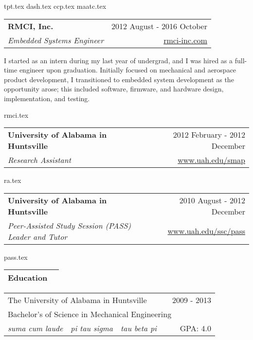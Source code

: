 \documentclass[10pt,a4paper]{article}
\newcommand{\csection}[1]{\Large\textbf{#1}}
\newcommand{\csubsection}[1]{\large\textbf{#1}}
\begin{document}
\bigskip

{tpt.tex}
{dash.tex}
{ccp.tex}
{maatc.tex}

\noindent\begin{tabularx}{\textwidth}{Xr}
  \toprule
  \csubsection{RMCI, Inc.}           & 2012 August - 2016 October                     \\
  \textit{Embedded Systems Engineer} & \href{https://www.rmci-inc.com/}{rmci-inc.com} \\
\end{tabularx}
\smallskip

I started as an intern during my last year of undergrad, and I was hired as a full-time
engineer upon graduation. Initially focused on mechanical and aerospace product
development, I transitioned to embedded system development as the opportunity arose; this
included software, firmware, and hardware design, implementation, and testing.

\bigskip

{rmci.tex}

\noindent\begin{tabularx}{\textwidth}{Xr}
  \toprule
  \csubsection{University of Alabama in Huntsville} & 2012 February - 2012 December                     \\
  \textit{Research Assistant}                       & \href{https://www.uah.edu/smap}{www.uah.edu/smap} \\
\end{tabularx}

{ra.tex}

\noindent\begin{tabularx}{\textwidth}{Xr}
  \toprule
  \csubsection{University of Alabama in Huntsville}            & 2010 August - 2012 December                               \\
  \textit{Peer-Assisted Study Session (PASS) Leader and Tutor} & \href{https://www.uah.edu/ssc/pass}{www.uah.edu/ssc/pass} \\
\end{tabularx}

{pass.tex}

\noindent\begin{tabularx}{\textwidth}{Xr}
  \csection{Education} & \\
  \bottomrule
\end{tabularx}
\smallskip

\noindent\begin{tabularx}{\textwidth}{cccXr}
  \multicolumn{3}{l}{The University of Alabama in Huntsville} &                       & 2009 - 2013                        \\
  \multicolumn{5}{l}{\hspace{.125in} Bachelor's of Science in Mechanical Engineering}                                      \\
  \hspace{.125in} \textit{suma cum laude}                     & \textit{pi tau sigma} & \textit{tau beta pi} &  & GPA: 4.0 \\
\end{tabularx}
\bigskip
\end{document}
